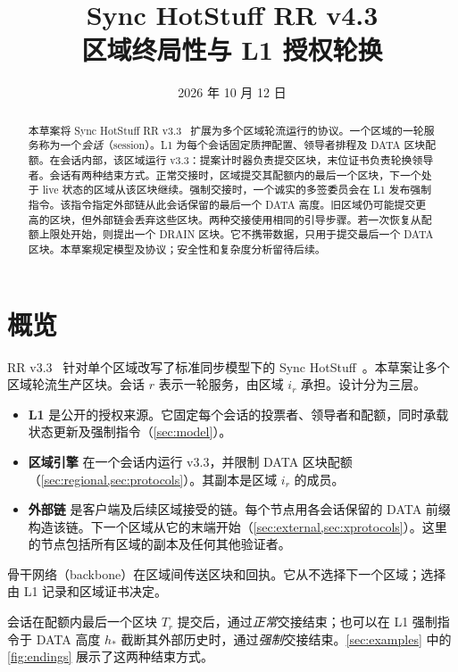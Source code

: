 \documentclass[11pt,a4paper]{article}
\title{Sync HotStuff RR v4.3\\\large 区域终局性与 L1 授权轮换}
\author{}\date{2026 年 10 月 12 日}
\newcounter{protocol}
\begin{document}
\maketitle
\begin{abstract}
本草案将 Sync HotStuff RR v3.3~\cite{rr33} 扩展为多个区域轮流运行的协议。一个区域的一轮服务称为一个\emph{会话}（session）。L1 为每个会话固定质押配置、领导者排程及 DATA 区块配额。在会话内部，该区域运行 v3.3：提案计时器负责提交区块，末位证书负责轮换领导者。会话有两种结束方式。正常交接时，区域提交其配额内的最后一个区块，下一个处于 live 状态的区域从该区块继续。强制交接时，一个诚实的多签委员会在 L1 发布强制指令。该指令指定外部链从此会话保留的最后一个 DATA 高度。旧区域仍可能提交更高的区块，但外部链会丢弃这些区块。两种交接使用相同的引导步骤。若一次恢复从配额上限处开始，则提出一个 DRAIN 区块。它不携带数据，只用于提交最后一个 DATA 区块。本草案规定模型及协议；安全性和复杂度分析留待后续。
\end{abstract}

\section{概览}
\label{sec:overview}
RR v3.3~\cite{rr33} 针对单个区域改写了标准同步模型下的 Sync HotStuff~\cite{sync}。本草案让多个区域轮流生产区块。会话 $r$ 表示一轮服务，由区域 $i_r$ 承担。设计分为三层。
\begin{itemize}
\item \textbf{L1} 是公开的授权来源。它固定每个会话的投票者、领导者和配额，同时承载状态更新及强制指令（\cref{sec:model}）。
\item \textbf{区域引擎} 在一个会话内运行 v3.3，并限制 DATA 区块配额（\cref{sec:regional,sec:protocols}）。其副本是区域 $i_r$ 的成员。
\item \textbf{外部链} 是客户端及后续区域接受的链。每个节点用各会话保留的 DATA 前缀构造该链。下一个区域从它的末端开始（\cref{sec:external,sec:xprotocols}）。这里的节点包括所有区域的副本及任何其他验证者。
\end{itemize}
骨干网络（backbone）在区域间传送区块和回执。它从不选择下一个区域；选择由 L1 记录和区域证书决定。

会话在配额内最后一个区块 $T_r$ 提交后，通过\emph{正常}交接结束；也可以在 L1 强制指令于 DATA 高度 $h_*$ 截断其外部历史时，通过\emph{强制}交接结束。\cref{sec:examples} 中的\cref{fig:endings} 展示了这两种结束方式。
\end{document}
